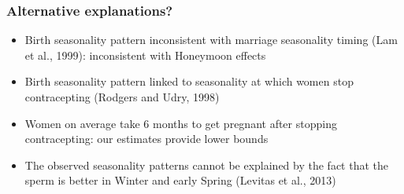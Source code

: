 \documentclass[10pt,letterpaper,subeqn]{beamer}
\begin{document}



\begin{frame}
\frametitle{Alternative explanations?}
\begin{itemize}
\item Birth seasonality pattern inconsistent with marriage seasonality timing (Lam et al., 1999): inconsistent with Honeymoon effects
\item Birth seasonality pattern linked to seasonality at which women stop contracepting (Rodgers and Udry,  1998)
\item Women on average take 6 months to get pregnant after stopping contracepting: our estimates provide lower bounds
\item The observed seasonality patterns cannot be explained by the fact that the sperm is better in Winter and early Spring (Levitas et al., 2013)
\end{itemize}
\end{frame}
\end{document}
